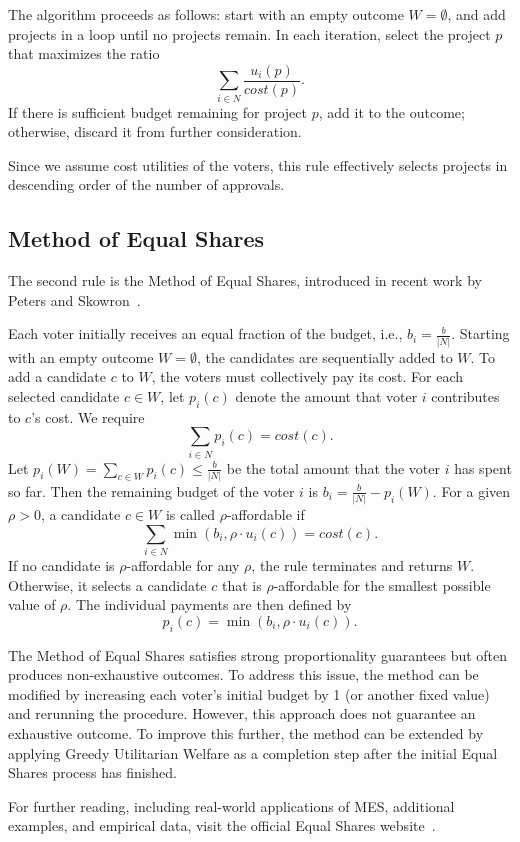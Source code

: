 \documentclass[magisterska,en]{pracamgr}
\begin{document}
The algorithm proceeds as follows: start with an empty outcome $W=\emptyset$, and add projects in a loop until no projects remain. In each iteration, select the project $p$ that maximizes the ratio
$$
\sum_{i\in N}\frac{u_i(p)}{cost(p)}.
$$
If there is sufficient budget remaining for project $p$, add it to the outcome; otherwise, discard it from further consideration.

Since we assume cost utilities of the voters, this rule effectively selects projects in descending order of the number of approvals.

\subsection{Method of Equal Shares}

The second rule is the Method of Equal Shares, introduced in recent work by Peters and Skowron~\cite{9}.

Each voter initially receives an equal fraction of the budget, i.e., $b_i=\frac{b}{|N|}$. Starting with an empty outcome $W=\emptyset$, the candidates are sequentially added to $W$. To add a candidate $c$ to $W$, the voters must collectively pay its cost. For each selected candidate $c\in W$, let $p_i(c)$ denote the amount that voter $i$ contributes to $c$'s cost. We require
$$
\sum_{i\in N}p_i(c)=cost(c).
$$
Let $p_i(W)=\sum_{c\in W}p_i(c)\leq\frac{b}{|N|}$ be the total amount that the voter $i$ has spent so far. Then the remaining budget of the voter $i$ is $b_i=\frac{b}{|N|}-p_i(W)$. For a given $\rho>0$, a candidate $c\in W$ is called $\rho$-affordable if
$$
\sum_{i\in N}\min(b_i, \rho\cdot u_i(c)) = cost(c).
$$
If no candidate is $\rho$-affordable for any $\rho$, the rule terminates and returns $W$. Otherwise, it selects a candidate $c$ that is $\rho$-affordable for the smallest possible value of $\rho$. The individual payments are then defined by
$$
p_i(c) = \min(b_i, \rho\cdot u_i(c)).
$$

The Method of Equal Shares satisfies strong proportionality guarantees but often produces non-exhaustive outcomes. To address this issue, the method can be modified by increasing each voter's initial budget by 1 (or another fixed value) and rerunning the procedure. However, this approach does not guarantee an exhaustive outcome. To improve this further, the method can be extended by applying Greedy Utilitarian Welfare as a completion step after the initial Equal Shares process has finished.

For further reading, including real-world applications of MES, additional examples, and empirical data, visit the official Equal Shares website~\cite{10}.
\end{document}
